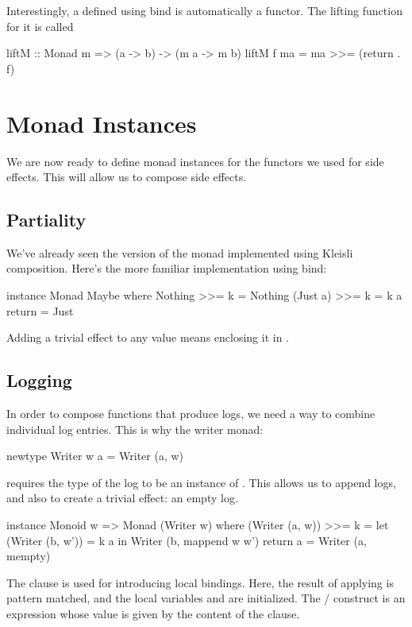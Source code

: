 \documentclass[DaoFP]{subfiles}
\begin{document}
Interestingly, a  defined using bind is automatically a functor. The lifting function for it is called 
\begin{haskell}
liftM :: Monad m => (a -> b) -> (m a -> m b)
liftM f ma = ma >>= (return . f)
\end{haskell}

\section{Monad Instances}

We are now ready to define monad instances for the functors we used for side effects. This will allow us to compose side effects.

\subsection{Partiality}
We've already seen the version of the  monad implemented using Kleisli composition. Here's the more familiar implementation using bind:
\begin{haskell}
instance Monad Maybe where
  Nothing >>= k = Nothing
  (Just a) >>= k = k a
  return = Just
\end{haskell}
Adding a trivial effect to any value means enclosing it in .
\subsection{Logging}
In order to compose functions that produce logs, we need a way to combine individual log entries. This is why the writer monad:
\begin{haskell}
newtype Writer w a = Writer (a, w)
\end{haskell}
requires the type of the log to be an instance of . This allows us to append logs, and also to create a trivial effect: an empty log.
\begin{haskell}
instance Monoid w => Monad (Writer w) where
  (Writer (a, w)) >>= k = let (Writer (b, w')) = k a
                          in Writer (b, mappend w w')
  return a = Writer (a, mempty)
\end{haskell}
The  clause is used for introducing local bindings. Here, the result of applying  is pattern matched, and the local variables  and  are initialized. The / construct is an expression whose value is given by the content of the  clause.
\end{document}
